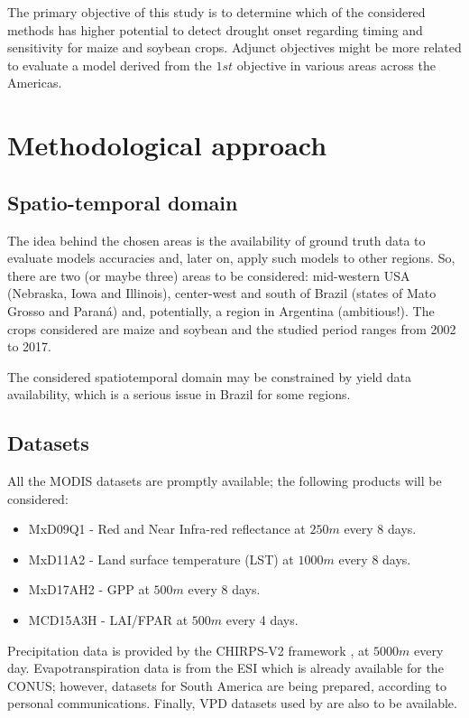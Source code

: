 \documentclass[hidelinks,12pt]{article}
\begin{document}
	
	The primary objective of this study is to determine which of the considered methods has higher potential to detect drought onset regarding timing and sensitivity for maize and soybean crops.  Adjunct objectives might be more related to evaluate a model derived from the $1st$ objective in various areas across the Americas. 
	

\section{Methodological approach}\label{s:method_app}

	\subsection{Spatio-temporal domain}
	The idea behind the chosen areas is the availability of ground truth data to evaluate models accuracies and, later on, apply such models to other regions. So, there are two (or maybe three) areas to be considered: mid-western USA (Nebraska, Iowa and Illinois), center-west and south of Brazil (states of Mato Grosso and Paraná) and, potentially, a region in Argentina (ambitious!). The crops considered are maize and soybean and the studied period ranges from 2002 to 2017. 
	
	The considered spatiotemporal domain may be constrained by yield data availability, which is a serious issue in Brazil for some regions.   
	
	\subsection{Datasets}
	All the MODIS datasets are promptly available; the following products will be considered:
	
	\vspace{-1em}
	\begin{itemize}
		\setlength\itemsep{-1em}
		\item MxD09Q1 - Red and Near Infra-red reflectance at $250m$ every 8 days.
		\item MxD11A2 - Land surface temperature (LST) at $1000m$ every 8 days.
		\item MxD17AH2 - GPP at $500m$ every 8 days.
		\item MCD15A3H - LAI/FPAR at $500m$ every 4 days.
	\end{itemize}
	\vspace{-1em}
	
	Precipitation data is provided by the CHIRPS-V2 framework \citep{Funk2015}, at $5000m$ every day. Evapotranspiration data is from the ESI which is already available for the CONUS; however, datasets for South America are being prepared, according to personal communications. Finally, VPD datasets used by \cite{Behrangi2016} are also to be available.  
	
\end{document}
